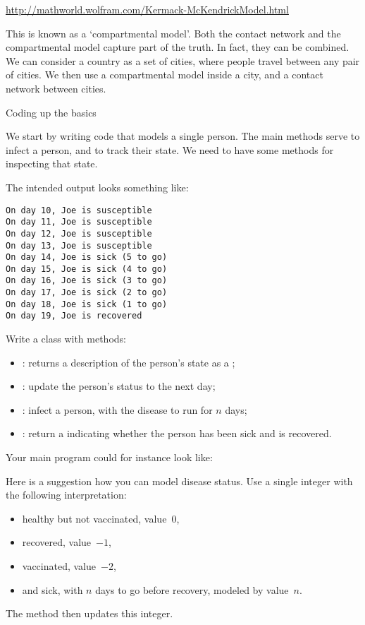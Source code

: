 \url{http://mathworld.wolfram.com/Kermack-McKendrickModel.html}

This is known as a `compartmental model'. Both the contact network and
the compartmental model capture part of the truth. In fact, they can
be combined. We can consider a country as a set of cities, where
people travel between any pair of cities. We then use a compartmental
model inside a city, and a contact network between cities.

 {Coding up the basics}

\prerequisite{\ref{ch:object}}

We start by writing code that models a single person. The main methods
serve to infect a person, and to track their state. We need to have
some methods for inspecting that state. 

The intended output looks something like:
\begin{verbatim}
On day 10, Joe is susceptible
On day 11, Joe is susceptible
On day 12, Joe is susceptible
On day 13, Joe is susceptible
On day 14, Joe is sick (5 to go)
On day 15, Joe is sick (4 to go)
On day 16, Joe is sick (3 to go)
On day 17, Joe is sick (2 to go)
On day 18, Joe is sick (1 to go)
On day 19, Joe is recovered
\end{verbatim}

\begin{exercise}
  \label{ex:infect:person}
  Write a  class with methods:
  \begin{itemize}
  \item {} : returns a description of the
    person's state as a ;
  \item {} : update the person's status to the next day;
  \item {} : infect a person, with the disease to run for
    $n$ days;
  \item {} : return a  indicating whether the
    person has been sick and is recovered.
  \end{itemize}
\end{exercise}

Your main program could for instance look like:

Here is a suggestion how you can model 
disease status. Use a single integer with the following interpretation:
\begin{itemize}
\item healthy but not vaccinated, value~$0$,
\item recovered, value~$-1$,
\item vaccinated, value~$-2$,
\item and sick, with $n$ days to go before recovery,  modeled by value~$n$.
\end{itemize}
The  method then updates this integer.


